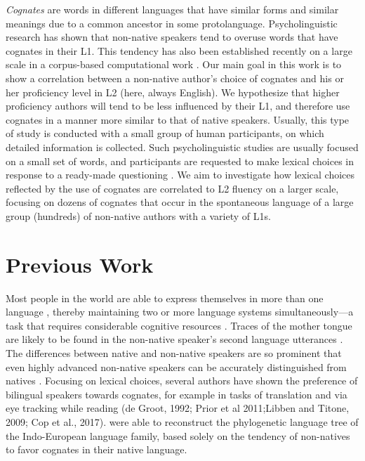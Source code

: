 \documentclass[11pt]{article}
\newcommand{\note}[1]{\textit{\small\color{magenta}{#1}}}
\begin{document}
\emph{Cognates} are words in different languages that have  similar forms and similar meanings due to a common ancestor in some protolanguage. Psycholinguistic research has shown that non-native speakers tend to overuse words that have cognates in their L1.  This tendency has also been established recently on a large scale in a corpus-based computational work \citep{TACL1403}.
Our main goal in this work is  to show a correlation between a non-native author's choice of cognates and his or her proficiency level in L2 (here, always English). 
We hypothesize that higher proficiency authors will tend to be less influenced by their L1, and therefore use cognates in a manner more similar to that of native speakers.
Usually, this type of study is conducted with a small group of human participants, on which detailed information is collected.  Such psycholinguistic studies are usually focused on a small set of words, and participants are requested to make lexical choices in response to a ready-made questioning \citep{prior:2006a,BIL:8852637}.
We aim to investigate how lexical choices reflected by the use of cognates are correlated to L2 fluency on a larger scale, focusing on dozens of cognates that occur in the spontaneous language of a large group (hundreds) of non-native authors with a variety of L1s.

\section{Previous Work}

Most people in the world are able to express themselves in more than one language \citep{grosjean2012psycholinguistics}, thereby maintaining two or more language systems simultaneously---a task that requires considerable cognitive resources  \citep{schlesinger:2003,hvelplund2014eye,Prior2014,Kroll_Bobb_Hoshino_2014}.
Traces of the mother tongue are likely to be found in the non-native speaker's second language utterances \citep{jarvis2008crosslinguistic}. The differences between native and non-native speakers are so prominent that even highly advanced non-native speakers can be accurately distinguished from natives \citep{tomokiyo2001you,bergsma2012stylometric,DBLP:conf/acl/RabinovichNOW16,D18-1395}. 
Focusing on lexical choices, several authors have shown the preference of bilingual speakers towards cognates, for example in tasks of translation and via eye tracking while reading  (de Groot, 1992; Prior et al 2011;Libben and Titone, 2009; Cop et al., 2017). 
\note{fix refs}
\citet{TACL1403} were able to reconstruct the phylogenetic language tree of the Indo-European language family, based solely on the tendency of non-natives to favor cognates in their native language.
\end{document}
